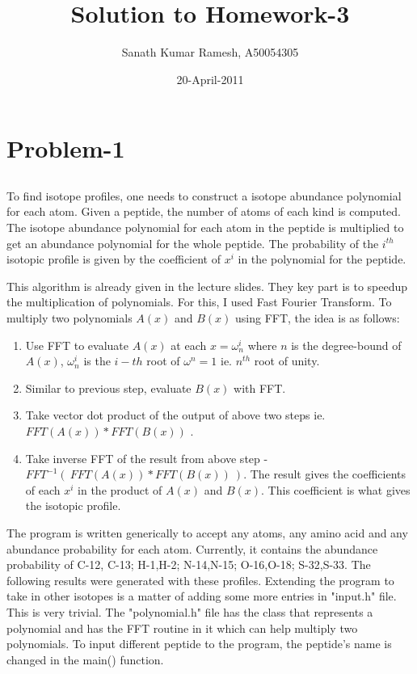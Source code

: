 \documentclass{article}
\begin{document}
\title{Solution to Homework-3}
\author{Sanath Kumar Ramesh, A50054305}
\date{20-April-2011}
\maketitle

\section{Problem-1}
\subsection{}
To find isotope profiles, one needs to construct a isotope abundance polynomial for each atom. Given a peptide, the number of atoms of each kind is computed. The isotope abundance polynomial for each atom in the peptide is multiplied to get an abundance polynomial for the whole peptide. The probability of the $i^{th}$ isotopic profile is given by the coefficient of $x^{i}$ in the polynomial for the peptide. 

This algorithm is already given in the lecture slides. They key part is to speedup the multiplication of polynomials. For this, I used Fast Fourier Transform. To multiply two polynomials $A(x)$ and $B(x)$ using FFT, the idea is as follows:

\begin{enumerate}
	\item Use FFT to evaluate $A(x)$ at each $x=\omega_{n}^{i}$ where $n$ is the degree-bound of $A(x)$, $\omega_{n}^{i}$ is the $i-th$ root of $\omega^{n}=1$ ie. $n^{th}$ root of unity.

	\item Similar to previous step, evaluate $B(x)$ with FFT.

	\item Take vector dot product of the output of above two steps ie. $ FFT( A(x) ) * FFT( B(x) )$ .

	\item Take inverse FFT of the result from above step - $FFT^{-1}(\ FFT( A(x) ) * FFT( B(x) )\ )$. The result gives the coefficients of each $x^{i}$ in the product of $A(x)$ and $B(x)$. This coefficient is what gives the isotopic profile.
\end{enumerate}

The program is written generically to accept any atoms, any amino acid and any abundance probability for each atom. Currently, it contains the abundance probability of C-12, C-13; H-1,H-2; N-14,N-15; O-16,O-18; S-32,S-33. The following results were generated with these profiles. Extending the program to take in other isotopes is a matter of adding some more entries in "input.h" file. This is very trivial. The "polynomial.h" file has the class that represents a polynomial and has the FFT routine in it which can help multiply two polynomials. To input different peptide to the program, the peptide's name is changed in the main() function.
\end{document}
